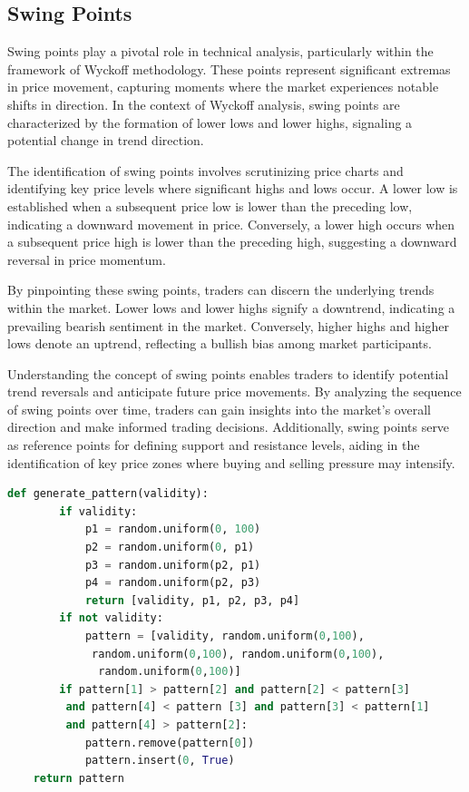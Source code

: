 \documentclass{article}
\begin{document}
\subsection{Swing Points}
Swing points play a pivotal role in technical analysis, particularly within the framework of Wyckoff methodology. These points represent significant extremas in price movement, capturing moments where the market experiences notable shifts in direction. In the context of Wyckoff analysis, swing points are characterized by the formation of lower lows and lower highs, signaling a potential change in trend direction.

The identification of swing points involves scrutinizing price charts and identifying key price levels where significant highs and lows occur. A lower low is established when a subsequent price low is lower than the preceding low, indicating a downward movement in price. Conversely, a lower high occurs when a subsequent price high is lower than the preceding high, suggesting a downward reversal in price momentum.

By pinpointing these swing points, traders can discern the underlying trends within the market. Lower lows and lower highs signify a downtrend, indicating a prevailing bearish sentiment in the market. Conversely, higher highs and higher lows denote an uptrend, reflecting a bullish bias among market participants.

Understanding the concept of swing points enables traders to identify potential trend reversals and anticipate future price movements. By analyzing the sequence of swing points over time, traders can gain insights into the market's overall direction and make informed trading decisions. Additionally, swing points serve as reference points for defining support and resistance levels, aiding in the identification of key price zones where buying and selling pressure may intensify.

\begin{lstlisting}[language=Python, caption={Creating the Trading Range Phase Pattern}]
	def generate_pattern(validity):
		if validity:
			p1 = random.uniform(0, 100)
			p2 = random.uniform(0, p1)
			p3 = random.uniform(p2, p1)
			p4 = random.uniform(p2, p3)
			return [validity, p1, p2, p3, p4]
		if not validity:
			pattern = [validity, random.uniform(0,100),
			 random.uniform(0,100), random.uniform(0,100),
			  random.uniform(0,100)]
		if pattern[1] > pattern[2] and pattern[2] < pattern[3]
		 and pattern[4] < pattern [3] and pattern[3] < pattern[1]
	 	 and pattern[4] > pattern[2]:
			pattern.remove(pattern[0])
			pattern.insert(0, True)
	return pattern
\end{lstlisting}
\end{document}
